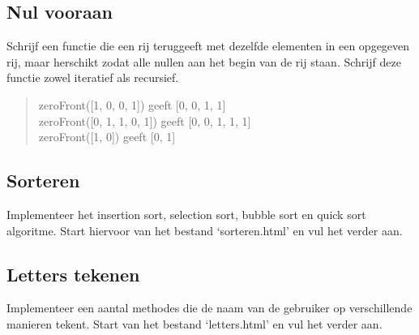 \subsection{Nul vooraan}

Schrijf een functie die een rij teruggeeft met dezelfde elementen in een opgegeven rij, maar herschikt zodat alle nullen aan het begin van de rij staan. Schrijf deze functie zowel iteratief als recursief.

\begin{quote}
zeroFront([1, 0, 0, 1]) geeft [0, 0, 1, 1] \\
zeroFront([0, 1, 1, 0, 1]) geeft [0, 0, 1, 1, 1] \\
zeroFront([1, 0]) geeft [0, 1] \\
\end{quote}

\subsection{Sorteren}

Implementeer het insertion sort, selection sort, bubble sort en quick sort algoritme. Start hiervoor van het bestand `sorteren.html' en vul het verder aan.

\subsection{Letters tekenen}

Implementeer een aantal methodes die de naam van de gebruiker op verschillende manieren tekent. Start van het bestand `letters.html' en vul het verder aan.
